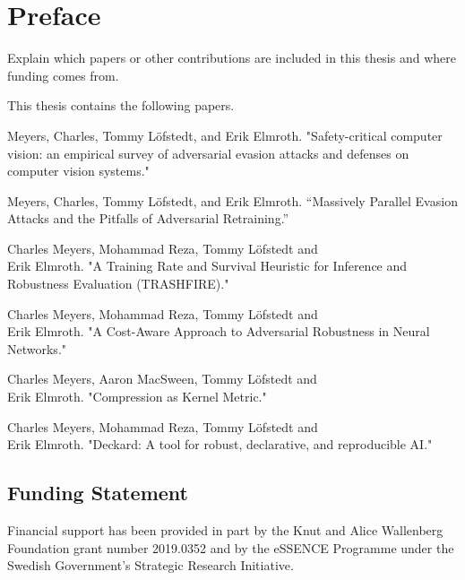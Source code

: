 \chapter*{Preface}
Explain which papers or other contributions are included in this thesis and where funding comes from.

This thesis contains the following papers.

\begin{paperlist}
    \item Meyers, Charles, Tommy L\"{o}fstedt, and Erik Elmroth. "Safety-critical computer vision: an empirical survey of adversarial evasion attacks and defenses on computer vision systems."
    
    \item Meyers, Charles, Tommy L\"{o}fstedt, and Erik Elmroth. “Massively Parallel Evasion Attacks and the Pitfalls of Adversarial Retraining.” 

    \item Charles Meyers, Mohammad Reza, Tommy L\"{o}fstedt and \\ Erik Elmroth. "A Training Rate and Survival Heuristic for Inference and Robustness Evaluation (TRASHFIRE)."

    \item Charles Meyers, Mohammad Reza, Tommy L\"{o}fstedt and \\ Erik Elmroth. "A Cost-Aware Approach to Adversarial Robustness in Neural Networks."

    \item Charles Meyers, Aaron MacSween, Tommy L\"{o}fstedt and \\ Erik Elmroth. "Compression as  Kernel Metric."

    \item Charles Meyers, Mohammad Reza, Tommy L\"{o}fstedt and \\ Erik Elmroth. "Deckard: A tool for robust, declarative, and reproducible AI."
    
\end{paperlist}



\section*{Funding Statement}

Financial support has been provided in part by the Knut and Alice Wallenberg Foundation grant number 2019.0352 and by the eSSENCE Programme under the Swedish Government's Strategic Research Initiative.